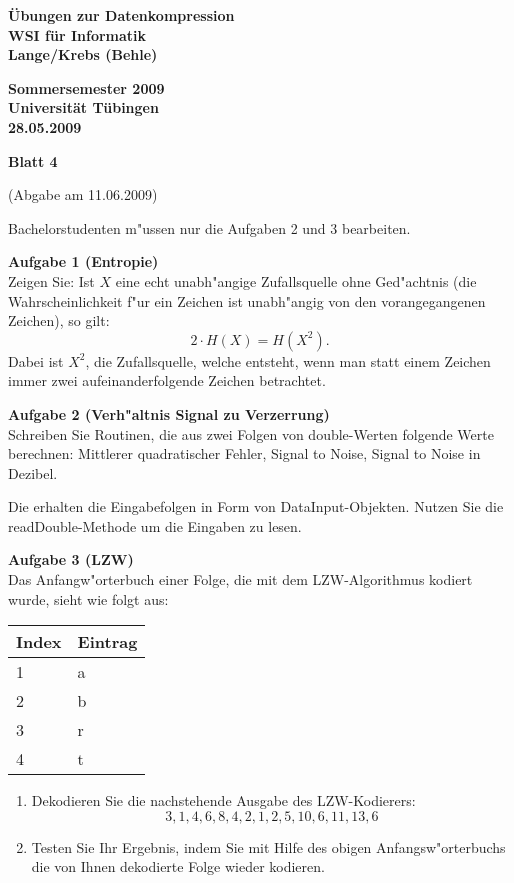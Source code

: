 \documentclass[a4paper]{article}
\def\header#1#2#3#4{\pagestyle{empty}
\noindent
\begin{minipage}[t]{0.6\textwidth}
\begin{flushleft}
\bf \"Ubungen zur Datenkompression\\
WSI f\"ur Informatik\\
Lange/Krebs (Behle)
\end{flushleft}
\end{minipage}
\begin{minipage}[t]{0.4\textwidth}
\begin{flushright}
\bf Sommersemester 2009\\
Universit\"at T\"ubingen\\
#2 %
\end{flushright}
\end{minipage}

\begin{center}
{\Large\bf Blatt #1}

{(Abgabe am #3)}
\end{center}
}
\begin{document}
\header{4}{28.05.2009}{11.06.2009}{}

\bigskip
Bachelorstudenten m"ussen nur die Aufgaben 2 und 3 bearbeiten.

\bigskip

{\bf Aufgabe 1  \quad(Entropie)}\\
Zeigen Sie: Ist $X$ eine echt unabh"angige Zufallsquelle ohne Ged"achtnis (die Wahrscheinlichkeit f"ur ein Zeichen ist unabh"angig von den vorangegangenen Zeichen), so gilt:
$$2\cdot H(X)= H(X^2).$$
Dabei ist $X^2$, die Zufallsquelle, welche entsteht, wenn man statt einem Zeichen immer zwei aufeinanderfolgende Zeichen betrachtet.

\bigskip

{\bf Aufgabe 2  \quad(Verh"altnis Signal zu Verzerrung)}\\
Schreiben Sie Routinen, die aus zwei Folgen von {\rm double}-Werten folgende Werte berechnen: Mittlerer quadratischer Fehler, Signal to Noise, Signal to Noise in Dezibel.

Die erhalten die Eingabefolgen in Form von {\rm DataInput}-Objekten. Nutzen Sie die {\rm readDouble}-Methode um die Eingaben zu lesen.


\bigskip

{\bf Aufgabe 3  \quad(LZW)}\\
Das Anfangw"orterbuch einer Folge, die mit dem LZW-Algorithmus kodiert wurde, sieht wie folgt aus:
\begin{center}
\begin{tabular}{|l|l|}\hline
Index & Eintrag\\\hline
1 & a\\
2 & b\\
3 & r\\
4 & t\\\hline
\end{tabular}
\end{center}
\begin{enumerate}
\item Dekodieren Sie die nachstehende Ausgabe des LZW-Kodierers:
$$3,1,4,6,8,4,2,1,2,5,10,6,11,13,6$$
\item Testen Sie Ihr Ergebnis, indem Sie mit Hilfe des obigen Anfangsw"orterbuchs die von Ihnen dekodierte Folge wieder kodieren.
\end{enumerate}
\end{document}
